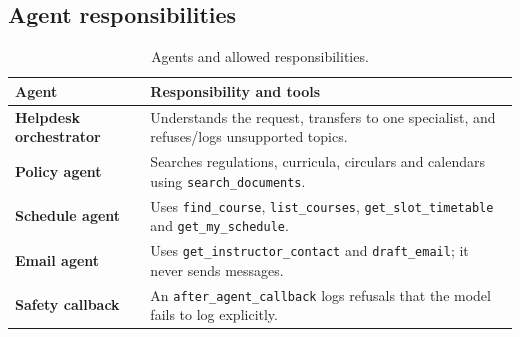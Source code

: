 \documentclass[11pt,a4paper]{article}
\newcommand{\tool}[1]{\texttt{#1}}
\begin{document}
\subsection{Agent responsibilities}
\begin{table}[H]
\centering
\caption{Agents and allowed responsibilities.}
\label{tab:agents}
\small
\begin{tabularx}{\textwidth}{>{\bfseries}p{} X}
\toprule
Agent & Responsibility and tools\\
\midrule
Helpdesk orchestrator & Understands the request, transfers to one specialist, and refuses/logs unsupported topics.\\
Policy agent & Searches regulations, curricula, circulars and calendars using \tool{search\_documents}.\\
Schedule agent & Uses \tool{find\_course}, \tool{list\_courses}, \tool{get\_slot\_timetable} and \tool{get\_my\_schedule}.\\
Email agent & Uses \tool{get\_instructor\_contact} and \tool{draft\_email}; it never sends messages.\\
Safety callback & An \texttt{after\_agent\_callback} logs refusals that the model fails to log explicitly.\\
\bottomrule
\end{tabularx}
\end{table}
\end{document}
